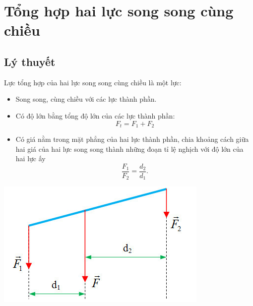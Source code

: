 \let\lesson\undefined
\newcommand{\lesson}{\phantomlesson{Bài 13: Tổng hợp lực song song cùng chiều}}
\chapter[Tổng hợp hai lực song song cùng chiều]{Tổng hợp hai lực song song cùng chiều}
\setcounter{section}{0}
\section{Lý thuyết}
Lực tổng hợp của hai lực song song cùng chiều là một lực:
\begin{itemize}
	\item Song song, cùng chiều với các lực thành phần.
	\item Có độ lớn bằng tổng độ lớn của các lực thành phần:
	$$F_t=F_1+F_2$$
	\item Có giá nằm trong mặt phẳng của hai lực thành phần, chia khoảng cách giữa hai giá của hai lực song song thành những đoạn tỉ lệ nghịch với độ lớn của hai lực ấy
	$$\dfrac{F_1}{F_2}=\dfrac{d_2}{d_1}.$$
\end{itemize}
\begin{center}
	\includegraphics[width=0.35\linewidth]{../figs/VN10-2023-PH-TP022-2}
\end{center}
